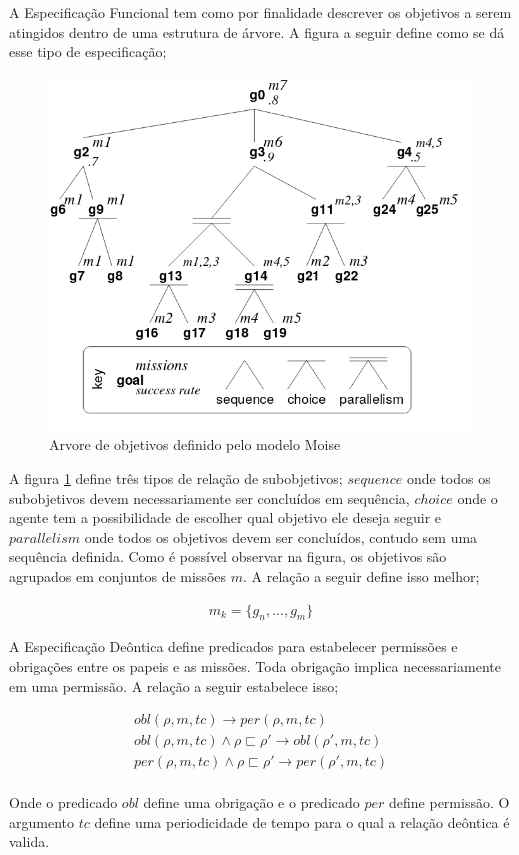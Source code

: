A Especificação Funcional tem como por finalidade descrever os objetivos a serem atingidos dentro de uma estrutura de árvore. A figura a seguir define como se dá esse tipo de especificação; 

\begin{figure}[H]
  \centering
  \includegraphics[width=0.8\linewidth]{figure/figmoise} 
  \caption{Arvore de objetivos definido pelo modelo Moise \cite{mosieframework}}
  \label{arvoremoise}
\end{figure}

A figura \ref{arvoremoise} define três tipos de relação de subobjetivos; $sequence$ onde todos os subobjetivos devem necessariamente ser concluídos em sequência, $choice$ onde o agente tem a 
possibilidade de escolher qual objetivo ele deseja seguir e $parallelism$ onde todos os objetivos devem ser concluídos, contudo sem uma sequência definida. Como é possível observar na figura, 
os objetivos são agrupados em conjuntos de missões $m$. A relação a seguir define isso melhor;

\begin{eqnarray}\nonumber
	m_k = \{ g_n,...,g_m\}
\end{eqnarray}


A Especificação Deôntica define predicados para estabelecer permissões e obrigações entre os papeis e as missões. Toda obrigação implica necessariamente em uma permissão. A relação a seguir 
estabelece isso; 

\begin{eqnarray}\nonumber
	obl(\rho,m,tc) \to per(\rho,m,tc) \\
	obl(\rho,m,tc) \wedge \rho \sqsubset \rho' \to obl(\rho',m,tc) \\
	per(\rho,m,tc) \wedge \rho \sqsubset \rho' \to per(\rho',m,tc) \\	
\end{eqnarray}

Onde o predicado $obl$ define uma obrigação e o predicado $per$ define permissão. O argumento $tc$ define uma periodicidade de tempo para o qual a relação deôntica é valida. 
